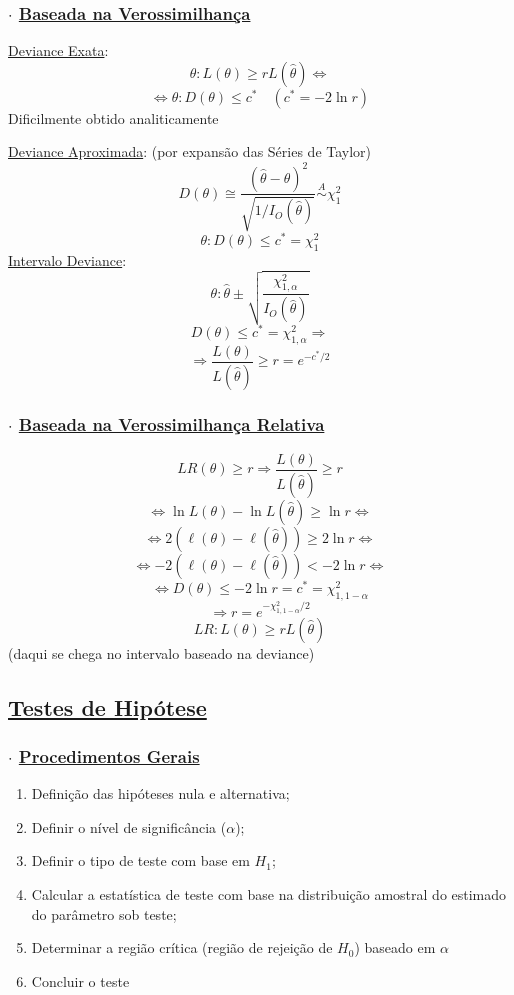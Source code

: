 \documentclass[11pt,a4paper]{article}
\begin{document}
\subsubsection*{$\cdot$ \underline{Baseada na Verossimilhança}}
\underline{Deviance Exata}:
\[ \theta : L(\theta)\geq r L(\hat{\theta}) \iff \]
\[ \iff \theta : D(\theta)\leq c^* \quad (c^* = -2\ln r) \]
Dificilmente obtido analiticamente

\underline{Deviance Aproximada}: (por expansão das Séries de Taylor)
\[ D(\theta) \cong \frac{(\hat{\theta}-\theta)^2}{\sqrt{1/I_O(\hat{\theta})}} \overset{A}{\sim} \chi^2_1 \]
\[ \theta : D(\theta)\leq c^* = \chi^2_1 \]
\underline{Intervalo Deviance}:
\[ \theta : \hat{\theta} \pm \sqrt{\frac{\chi^2_{1,\alpha}}{I_O(\hat{\theta})}} \]
\[ D(\theta)\leq c^* = \chi^2_{1,\alpha} \Rightarrow \]
\[ \Rightarrow \frac{L(\theta)}{L(\hat{\theta})} \geq r = e^{-c^*/2} \]

\subsubsection*{$\cdot$ \underline{Baseada na Verossimilhança Relativa}}
\[ LR(\theta)\geq r \Rightarrow \frac{L(\theta)}{L(\hat{\theta})}\geq r \]
\[ \iff \ln L(\theta) - \ln L(\hat{\theta}) \geq \ln r \iff \]
\[ \iff 2(\ell(\theta)-\ell(\hat{\theta})) \geq 2\ln r \iff \]
\[ \iff -2(\ell(\theta)-\ell(\hat{\theta})) < -2\ln r \iff \]
\[ \iff D(\theta) \leq -2\ln r = c^* = \chi^2_{1,1-\alpha} \]
\[ \Rightarrow r = e^{-\chi^2_{1,1-\alpha}/2} \]
\[ LR: L(\theta)\geq r L(\hat{\theta}) \]
(daqui se chega no intervalo baseado na deviance)

\subsection*{\underline{Testes de Hipótese}}
\subsubsection*{$\cdot$ \underline{Procedimentos Gerais}}
\begin{enumerate}[label=\arabic*)]
  \item Definição das hipóteses nula e alternativa;
  \item Definir o nível de significância ($\alpha$);
  \item Definir o tipo de teste com base em $H_1$;
  \item Calcular a estatística de teste com base na distribuição amostral do estimado do parâmetro sob teste;
  \item Determinar a região crítica (região de rejeição de $H_0$) baseado em $\alpha$
  \item Concluir o teste
\end{enumerate}
\end{document}
